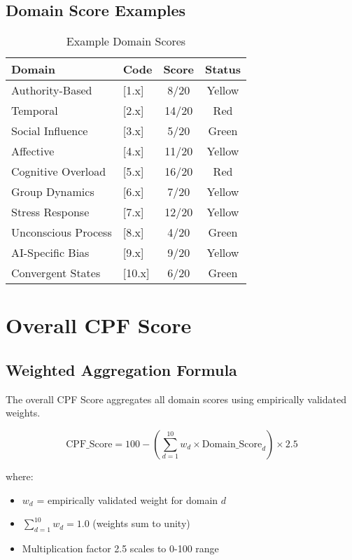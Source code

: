 \documentclass[11pt,a4paper]{article}
\begin{document}
\subsection{Domain Score Examples}

\begin{table}[h]
\centering
\caption{Example Domain Scores}
\label{tab:domain_example}
\begin{tabular}{llcc}
\toprule
\textbf{Domain} & \textbf{Code} & \textbf{Score} & \textbf{Status} \\
\midrule
Authority-Based & {[}1.x{]} & 8/20 & Yellow \\
Temporal & {[}2.x{]} & 14/20 & Red \\
Social Influence & {[}3.x{]} & 5/20 & Green \\
Affective & {[}4.x{]} & 11/20 & Yellow \\
Cognitive Overload & {[}5.x{]} & 16/20 & Red \\
Group Dynamics & {[}6.x{]} & 7/20 & Yellow \\
Stress Response & {[}7.x{]} & 12/20 & Yellow \\
Unconscious Process & {[}8.x{]} & 4/20 & Green \\
AI-Specific Bias & {[}9.x{]} & 9/20 & Yellow \\
Convergent States & {[}10.x{]} & 6/20 & Green \\
\bottomrule
\end{tabular}
\end{table}

\section{Overall CPF Score}

\subsection{Weighted Aggregation Formula}

The overall CPF Score aggregates all domain scores using empirically validated weights.

\begin{equation}
\text{CPF\_Score} = 100 - \left( \sum_{d=1}^{10} w_d \times \text{Domain\_Score}_d \right) \times 2.5
\end{equation}

where:
\begin{itemize}
\item $w_d$ = empirically validated weight for domain $d$
\item $\sum_{d=1}^{10} w_d = 1.0$ (weights sum to unity)
\item Multiplication factor 2.5 scales to 0-100 range
\end{itemize}
\end{document}
